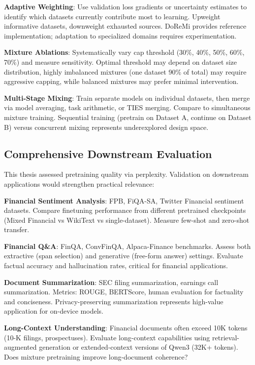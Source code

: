\textbf{Adaptive Weighting}: Use validation loss gradients or uncertainty estimates to identify which datasets currently contribute most to learning. Upweight informative datasets, downweight exhausted sources. DoReMi \parencite{xie2023doremi} provides reference implementation; adaptation to specialized domains requires experimentation.

\textbf{Mixture Ablations}: Systematically vary cap threshold (30\%, 40\%, 50\%, 60\%, 70\%) and measure sensitivity. Optimal threshold may depend on dataset size distribution, highly imbalanced mixtures (one dataset 90\% of total) may require aggressive capping, while balanced mixtures may prefer minimal intervention.

\textbf{Multi-Stage Mixing}: Train separate models on individual datasets, then merge via model averaging, task arithmetic, or TIES merging. Compare to simultaneous mixture training. Sequential training (pretrain on Dataset A, continue on Dataset B) versus concurrent mixing represents underexplored design space.

\subsection{Comprehensive Downstream Evaluation}

This thesis assessed pretraining quality via perplexity. Validation on downstream applications would strengthen practical relevance:

\textbf{Financial Sentiment Analysis}: FPB, FiQA-SA, Twitter Financial sentiment datasets. Compare finetuning performance from different pretrained checkpoints (Mixed Financial vs WikiText vs single-dataset). Measure few-shot and zero-shot transfer.

\textbf{Financial Q\&A}: FinQA, ConvFinQA, Alpaca-Finance benchmarks. Assess both extractive (span selection) and generative (free-form answer) settings. Evaluate factual accuracy and hallucination rates, critical for financial applications.

\textbf{Document Summarization}: SEC filing summarization, earnings call summarization. Metrics: ROUGE, BERTScore, human evaluation for factuality and conciseness. Privacy-preserving summarization represents high-value application for on-device models.

\textbf{Long-Context Understanding}: Financial documents often exceed 10K tokens (10-K filings, prospectuses). Evaluate long-context capabilities using retrieval-augmented generation or extended-context versions of Qwen3 (32K+ tokens). Does mixture pretraining improve long-document coherence?

